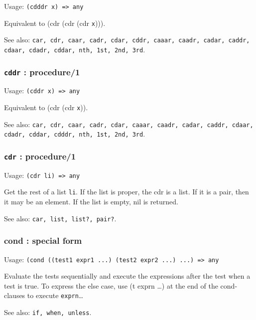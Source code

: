\documentclass[
]{article}
\newcommand{\passthrough}[1]{#1}
\begin{document}
Usage: \passthrough{\lstinline!(cdddr x) => any!}

Equivalent to (cdr (cdr (cdr \passthrough{\lstinline!x!}))).

See also:
\passthrough{\lstinline!car, cdr, caar, cadr, cdar, cddr, caaar, caadr, cadar, caddr, cdaar, cdadr, cddar, nth, 1st, 2nd, 3rd!}.

\hypertarget{cddr-procedure1}{%
\subsubsection{\texorpdfstring{\texttt{cddr} :
procedure/1}{cddr : procedure/1}}\label{cddr-procedure1}}

Usage: \passthrough{\lstinline!(cddr x) => any!}

Equivalent to (cdr (cdr \passthrough{\lstinline!x!})).

See also:
\passthrough{\lstinline!car, cdr, caar, cadr, cdar, caaar, caadr, cadar, caddr, cdaar, cdadr, cddar, cdddr, nth, 1st, 2nd, 3rd!}.

\hypertarget{cdr-procedure1}{%
\subsubsection{\texorpdfstring{\texttt{cdr} :
procedure/1}{cdr : procedure/1}}\label{cdr-procedure1}}

Usage: \passthrough{\lstinline!(cdr li) => any!}

Get the rest of a list \passthrough{\lstinline!li!}. If the list is
proper, the cdr is a list. If it is a pair, then it may be an element.
If the list is empty, nil is returned.

See also: \passthrough{\lstinline!car, list, list?, pair?!}.

\hypertarget{cond-special-form}{%
\subsubsection{cond : special form}\label{cond-special-form}}

Usage:
\passthrough{\lstinline!(cond ((test1 expr1 ...) (test2 expr2 ...) ...) => any!}

Evaluate the tests sequentially and execute the expressions after the
test when a test is true. To express the else case, use (t exprn \ldots)
at the end of the cond-clauses to execute
\passthrough{\lstinline!exprn!}\ldots{}

See also: \passthrough{\lstinline!if, when, unless!}.
\end{document}
